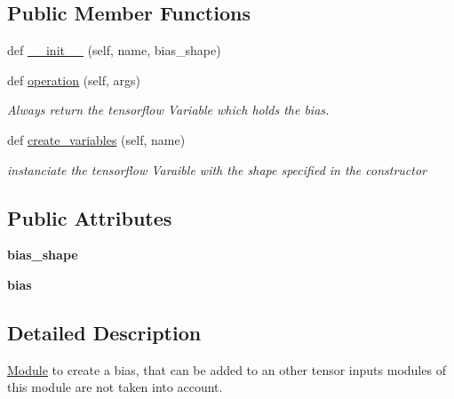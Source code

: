 \subsection*{Public Member Functions}
\begin{DoxyCompactItemize}
\item 
def \hyperlink{classmodules_1_1_bias_module_a680a602fe8d3f45ef483964d1b30e42b}{\+\_\+\+\_\+init\+\_\+\+\_\+} (self, name, bias\+\_\+shape)
\item 
\mbox{\label{classmodules_1_1_bias_module_a1cfd19d6bc40759cb6a8127d50c34a80}} 
def \hyperlink{classmodules_1_1_bias_module_a1cfd19d6bc40759cb6a8127d50c34a80}{operation} (self, args)
\begin{DoxyCompactList}\small\item\em Always return the tensorflow Variable which holds the bias. \end{DoxyCompactList}\item 
\mbox{\label{classmodules_1_1_bias_module_ae304d936f9ef989264d4be74f41282ac}} 
def \hyperlink{classmodules_1_1_bias_module_ae304d936f9ef989264d4be74f41282ac}{create\+\_\+variables} (self, name)
\begin{DoxyCompactList}\small\item\em instanciate the tensorflow Varaible with the shape specified in the constructor \end{DoxyCompactList}\end{DoxyCompactItemize}
\subsection*{Public Attributes}
\begin{DoxyCompactItemize}
\item 
\mbox{\label{classmodules_1_1_bias_module_a1ee79711d62e3e8e13bec2e9f3a2cf98}} 
{\bfseries bias\+\_\+shape}
\item 
\mbox{\label{classmodules_1_1_bias_module_a9b6d3fe09f56ef6ef266c1d6e22f8893}} 
{\bfseries bias}
\end{DoxyCompactItemize}


\subsection{Detailed Description}
\hyperlink{classmodules_1_1_module}{Module} to create a bias, that can be added to an other tensor inputs modules of this module are not taken into account. 


